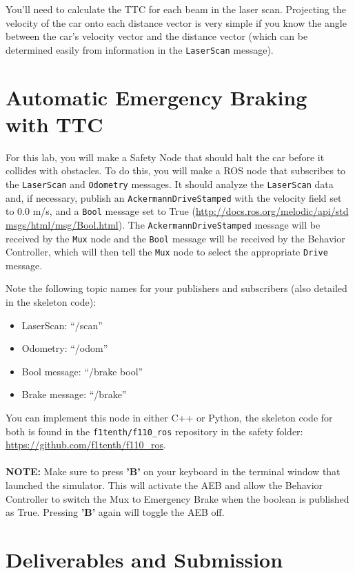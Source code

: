 \documentclass[letta4 paper]{article}
\numberwithin{equation}{section}
\newcommand{\0}{\mathbf{0}}
\begin{document}
	You'll need to calculate the TTC for each beam in the laser scan. Projecting the velocity of the car onto each distance vector is very simple if you know the angle between the car’s velocity vector and the distance vector (which can be determined easily from information in the \texttt{LaserScan} message).
	
	\section{Automatic Emergency Braking with TTC}
	
	For this lab, you will make a Safety Node that should halt the car before it collides with obstacles. To do this, you will make a ROS node that subscribes to the \texttt{LaserScan} and \texttt{Odometry} messages. It should analyze the \texttt{LaserScan} data and, if necessary, publish an \texttt{AckermannDriveStamped} with the velocity field set to 0.0 m/s, and a \texttt{Bool} message set to True (\url{http://docs.ros.org/melodic/api/std msgs/html/msg/Bool.html}). The \texttt{AckermannDriveStamped} message will be received by the \texttt{Mux} node and the \texttt{Bool} message will be received by the Behavior Controller, which will then tell the \texttt{Mux} node to select the appropriate \texttt{Drive} message.
	
	Note the following topic names for your publishers and subscribers (also detailed in the skeleton code): 
	
	\begin{itemize}
		\item LaserScan: “/scan”
		\item Odometry: “/odom”
		\item Bool message: “/brake bool”
		\item Brake message: “/brake”
	\end{itemize}
	
	You can implement this node in either C++ or Python, the skeleton code for both is found in the \texttt{f1tenth/f110\_ros} repository in the safety folder: \url{https://github.com/f1tenth/f110_ros}.
	\\
	\\
	\textbf{NOTE:} Make sure to press \textbf{’B’} on your keyboard in the terminal window that launched the simulator. This will activate the AEB and allow the Behavior Controller to switch the Mux to Emergency Brake when the boolean is published as True. Pressing \textbf{’B’} again will toggle the AEB off.
	
	\section{Deliverables and Submission}
	
\end{document}

